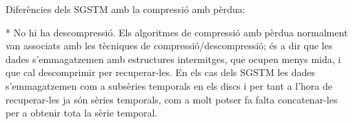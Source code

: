 Diferències dels SGSTM amb la compressió amb pèrdua: 

* No hi ha descompressió. Els algoritmes de compressió amb pèrdua normalment van associats amb les tècniques de compressió/descompressió; és a dir que les dades s'emmagatzemen amb estructures intermitges, que ocupen menys mida, i que cal descomprimir per recuperar-les. En els cas dels SGSTM les dades s'emmagatzemen com a subsèries temporals en els discs i per tant a l'hora de recuperar-les ja són sèries temporals, com a molt potser fa falta concatenar-les per a obtenir tota la sèrie temporal.







